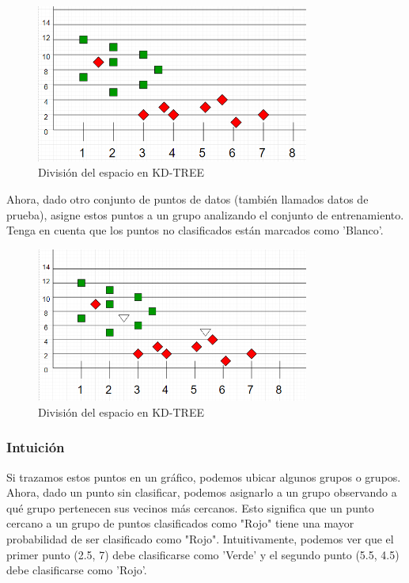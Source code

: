 \documentclass{article}
\begin{document}
\begin{figure}[h!]
	\centering
	\includegraphics[width=0.8\textwidth]{img/knn_01.png}
	\caption{División del espacio en KD-TREE}
	\label{fig:knn_01}
\end{figure}

Ahora, dado otro conjunto de puntos de datos (también llamados datos de prueba), asigne estos puntos a un grupo analizando el conjunto de entrenamiento. Tenga en cuenta que los puntos no clasificados están marcados como 'Blanco'.

\begin{figure}[h!]
	\centering
	\includegraphics[width=0.8\textwidth]{img/knn_02.png}
	\caption{División del espacio en KD-TREE}
	\label{fig:knn_02}
\end{figure}

\subsubsection{Intuición}
Si trazamos estos puntos en un gráfico, podemos ubicar algunos grupos o grupos. Ahora, dado un punto sin clasificar, podemos asignarlo a un grupo observando a qué grupo pertenecen sus vecinos más cercanos. Esto significa que un punto cercano a un grupo de puntos clasificados como "Rojo" tiene una mayor probabilidad de ser clasificado como "Rojo".
Intuitivamente, podemos ver que el primer punto (2.5, 7) debe clasificarse como 'Verde' y el segundo punto (5.5, 4.5) debe clasificarse como 'Rojo'.
\end{document}

